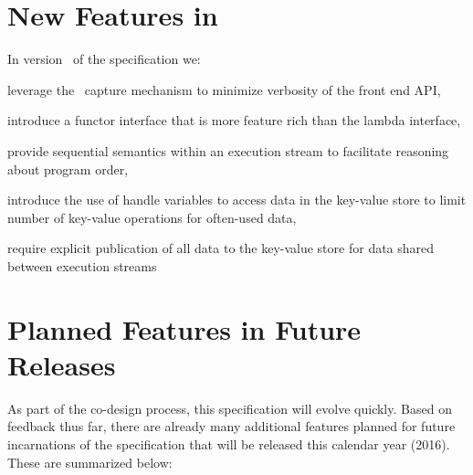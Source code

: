 \section{New Features in \specVersion}
\label{sec:current}
In version \specVersion\ of the specification we:
  \begin{compactenum}
\item leverage the \CC\ \gls{capture} mechanism to minimize verbosity of the \gls{front end}
    \gls{API},
\item introduce a functor interface that is more feature rich than the lambda interface,
\item provide \gls{sequential semantics} within an \gls{execution stream} to
    facilitate reasoning about program order,
\item introduce the use of
    \gls{handle} variables to access data in the \gls{key-value store} to limit number of key-value operations for often-used data,
\item require explicit publication of all data to the \gls{key-value store} for data shared between execution streams
\end{compactenum}



\section{Planned Features in Future Releases}
\label{sec:future}

As part of the \gls{co-design} process, this specification will evolve quickly.
  Based on feedback thus far, there are already
many additional features planned for future incarnations of the specification that
will be released this calendar year (2016).  These are summarized below:

